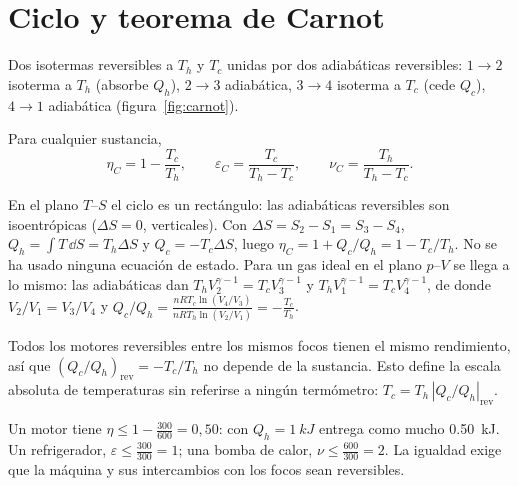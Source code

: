 \section{Ciclo y teorema de Carnot}

\begin{definicion}
Dos isotermas reversibles a $T_h$ y $T_c$ unidas por dos adiabáticas reversibles: $1\to2$ isoterma a $T_h$
(absorbe $Q_h$), $2\to3$ adiabática, $3\to4$ isoterma a $T_c$ (cede $Q_c$), $4\to1$ adiabática
(figura~\ref{fig:carnot}).
\end{definicion}

\begin{proposicion}
Para cualquier sustancia,
\begin{equation}\label{eq:carnot}
  \eta_C=1-\frac{T_c}{T_h},\qquad \varepsilon_C=\frac{T_c}{T_h-T_c},\qquad \nu_C=\frac{T_h}{T_h-T_c}.
\end{equation}
\end{proposicion}

\begin{demostracion}
En el plano $T$--$S$ el ciclo es un rectángulo: las adiabáticas reversibles son isoentrópicas
($\Delta S=0$, verticales). Con $\Delta S=S_2-S_1=S_3-S_4$,
$Q_h=\int T\,\dd S=T_h\Delta S$ y $Q_c=-T_c\Delta S$, luego $\eta_C=1+Q_c/Q_h=1-T_c/T_h$. No se ha usado
ninguna ecuación de estado. Para un gas ideal en el plano $p$--$V$ se llega a lo mismo: las adiabáticas
dan $T_hV_2^{\gamma-1}=T_cV_3^{\gamma-1}$ y $T_hV_1^{\gamma-1}=T_cV_4^{\gamma-1}$, de donde $V_2/V_1=V_3/V_4$ y
$Q_c/Q_h=\frac{nRT_c\ln(V_4/V_3)}{nRT_h\ln(V_2/V_1)}=-\frac{T_c}{T_h}$.
\end{demostracion}



\begin{observacion}
Todos los motores reversibles entre los mismos focos tienen el mismo rendimiento, así que
$(Q_c/Q_h)_{\mathrm{rev}}=-T_c/T_h$ no depende de la sustancia. Esto define la escala absoluta de temperaturas
sin referirse a ningún termómetro: $T_c=T_h\,|Q_c/Q_h|_{\mathrm{rev}}$.
\end{observacion}

\begin{ejemplo}
Un motor tiene $\eta\leq1-\frac{300}{600}=0{,}50$: con $Q_h=\SI{1}{kJ}$ entrega como mucho \SI{0,50}{kJ}. Un
refrigerador, $\varepsilon\leq\frac{300}{300}=1$; una bomba de calor, $\nu\leq\frac{600}{300}=2$. La igualdad exige
que la máquina y sus intercambios con los focos sean reversibles.
\end{ejemplo}

